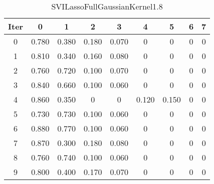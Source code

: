 \begin{table}
	\begin{center}
		\begin{tabular}{|c|c|c|c|c|c|c|c|c|}
			\hline
			Iter & 0 & 1 & 2 & 3 & 4 & 5 & 6 & 7 \\
			\hline
			0 & 0.780 & 0.380 & 0.180 & 0.070 & 0 & 0 & 0 & 0 \\
			\hline
			1 & 0.810 & 0.340 & 0.160 & 0.080 & 0 & 0 & 0 & 0 \\
			\hline
			2 & 0.760 & 0.720 & 0.100 & 0.070 & 0 & 0 & 0 & 0 \\
			\hline
			3 & 0.840 & 0.660 & 0.100 & 0.060 & 0 & 0 & 0 & 0 \\
			\hline
			4 & 0.860 & 0.350 & 0 & 0 & 0.120 & 0.150 & 0 & 0 \\
			\hline
			5 & 0.730 & 0.730 & 0.100 & 0.060 & 0 & 0 & 0 & 0 \\
			\hline
			6 & 0.880 & 0.770 & 0.100 & 0.060 & 0 & 0 & 0 & 0 \\
			\hline
			7 & 0.870 & 0.300 & 0.180 & 0.080 & 0 & 0 & 0 & 0 \\
			\hline
			8 & 0.760 & 0.740 & 0.100 & 0.060 & 0 & 0 & 0 & 0 \\
			\hline
			9 & 0.800 & 0.400 & 0.170 & 0.070 & 0 & 0 & 0 & 0 \\
			\hline
		\end{tabular}
	\end{center}
	\caption{SVILassoFullGaussianKernel1.8}
\end{table}
